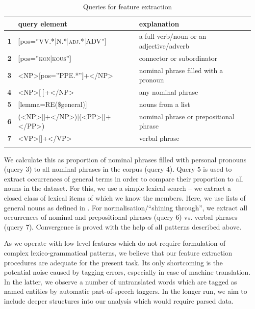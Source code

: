 \documentclass[output=paper]{LSP/langsci}
\begin{document}
\begin{table}
     \centering
     \begin{tabular}{lll}
\lsptoprule
              & \textbf{query element}         & \textbf{explanation} \\ \midrule
\textbf{1}    & [pos=”VV.*|N.*|\textsc{adj}.*|ADV”]     & a full verb/noun or an adjective/adverb \\
\textbf{2}    & [pos=”\textsc{kon}|\textsc{kous}”]               & connector or subordinator \\
\textbf{3}    & <NP>[pos=”PPE.*”]+</NP>		   & nominal phrase filled with a pronoun \\
\textbf{4}    & <NP>[ ]+</NP>             & any nominal phrase \\ 
\textbf{5}    & [lemma=RE(\$general)]     & nouns from a list   \\ 
\textbf{6}    & (<NP>[]+</NP>)|(<PP>[]+</PP>) & nominal phrase or prepositional phrase \\
\textbf{7}    & <VP>[]+</VP> & verbal phrase\\
\lspbottomrule
     \end{tabular}

 \caption{Queries for feature extraction}
     \label{tab:4.1}
\end{table}

We calculate this as proportion of nominal phrases filled with personal pronouns (query 3) to all nominal phrases in the corpus (query 4). Query 5 is used to extract occurrences of general terms in order to compare their proportion to all nouns in the dataset. For this, we use a simple lexical search – we extract a closed class of lexical items of which we know the members. Here, we use lists of general nouns as defined in \citep{Dipper2012}. For normalisation/“shining through”, we extract all occurrences of nominal and prepositional phrases (query 6) vs. verbal phrases (query 7). Convergence is proved with the help of all patterns described above.

As we operate with low-level features which do not require formulation of complex lexico-grammatical patterns, we believe that our feature extraction procedures are adequate for the present task.  Its only shortcoming is the potential noise caused by tagging errors, especially in case of machine translation. In the latter, we observe a number of untranslated words which are tagged as named entities by automatic part-of-speech taggers.  In the longer run, we aim to include deeper structures into our analysis which would require parsed data.
\end{document}
